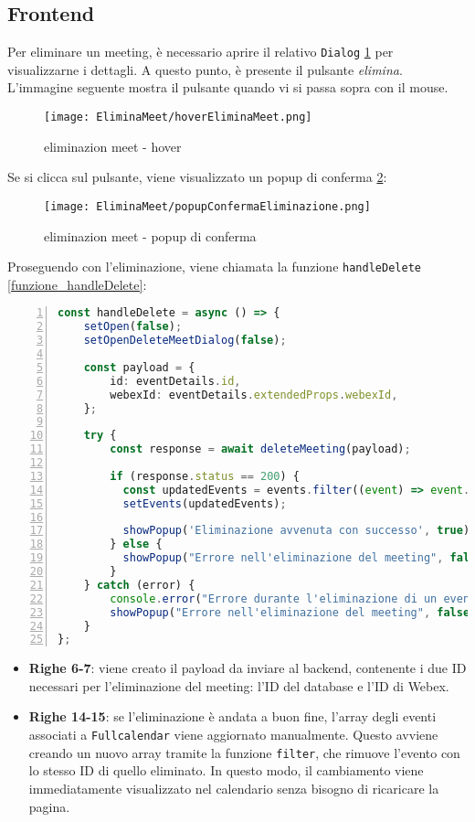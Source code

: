 \subsection{Frontend}
Per eliminare un meeting, è necessario aprire il relativo \texttt{Dialog} \ref{eliminazion_meet_hover} per visualizzarne i dettagli. 
A questo punto, è presente il pulsante \textit{elimina}. 
L'immagine seguente mostra il pulsante quando vi si passa sopra con il mouse.
\begin{figure}[H]
    \centering
    \texttt{[image: EliminaMeet/hoverEliminaMeet.png]}
    \caption{eliminazion meet - hover}
    \label{eliminazion_meet_hover}
\end{figure}
\noindent Se si clicca sul pulsante, viene visualizzato un popup di conferma \ref{eliminazion_meet_popup_di_conferma}:
\begin{figure}[H]
    \centering
    \texttt{[image: EliminaMeet/popupConfermaEliminazione.png]}
    \caption{eliminazion meet - popup di conferma}
    \label{eliminazion_meet_popup_di_conferma}
\end{figure}
\noindent Proseguendo con l'eliminazione, viene chiamata la funzione \texttt{handleDelete} \ref{funzione_handleDelete}:
\begin{lstlisting}[language=typescript, frame=lines, basicstyle=\ttfamily\scriptsize, numbers=left, 
    caption={funzione handleDelete}, label={funzione_handleDelete}]
const handleDelete = async () => {
    setOpen(false);
    setOpenDeleteMeetDialog(false);
  
    const payload = {
        id: eventDetails.id,
        webexId: eventDetails.extendedProps.webexId,
    };
  
    try {
        const response = await deleteMeeting(payload);
  
        if (response.status == 200) {
          const updatedEvents = events.filter((event) => event.id != eventDetails.id);
          setEvents(updatedEvents);
  
          showPopup('Eliminazione avvenuta con successo', true);
        } else {
          showPopup("Errore nell'eliminazione del meeting", false);
        }
    } catch (error) {
        console.error("Errore durante l'eliminazione di un evento:", error);
        showPopup("Errore nell'eliminazione del meeting", false);
    }
};
\end{lstlisting}
\begin{itemize}
    \item \textbf{Righe 6-7}:  viene creato il payload da inviare al backend, 
    contenente i due ID necessari per l'eliminazione del meeting: l'ID del database e l'ID di Webex.

    \item \textbf{Righe 14-15}: se l'eliminazione è andata a buon fine, l'array degli eventi associati a \texttt{Fullcalendar} 
    viene aggiornato manualmente. Questo avviene creando un nuovo array tramite la funzione \texttt{filter}, 
    che rimuove l'evento con lo stesso ID di quello eliminato. In questo modo, il cambiamento viene immediatamente visualizzato
    nel calendario senza bisogno di ricaricare la pagina.
\end{itemize}
